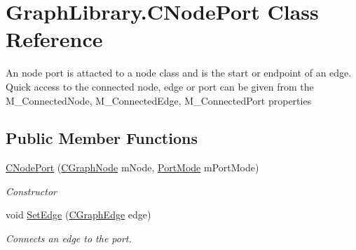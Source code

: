 \hypertarget{class_graph_library_1_1_c_node_port}{}\section{Graph\+Library.\+C\+Node\+Port Class Reference}
\label{class_graph_library_1_1_c_node_port}


An node port is attacted to a node class and is the start or endpoint of an edge. Quick access to the connected node, edge or port can be given from the M\+\_\+\+Connected\+Node, M\+\_\+\+Connected\+Edge, M\+\_\+\+Connected\+Port properties  


\subsection*{Public Member Functions}
\begin{DoxyCompactItemize}
\item 
\hyperlink{class_graph_library_1_1_c_node_port_a49f34a571bc273a2ad1360d67734e602}{C\+Node\+Port} (\hyperlink{class_graph_library_1_1_c_graph_node}{C\+Graph\+Node} m\+Node, \hyperlink{namespace_graph_library_a31c4a22c3817f16aa24bafc1c822c3a4}{Port\+Mode} m\+Port\+Mode)
\begin{DoxyCompactList}\small\item\em Constructor \end{DoxyCompactList}\item 
void \hyperlink{class_graph_library_1_1_c_node_port_ac1eff0d499611bc85bd8a063f055a9a0}{Set\+Edge} (\hyperlink{class_graph_library_1_1_c_graph_edge}{C\+Graph\+Edge} edge)
\begin{DoxyCompactList}\small\item\em Connects an edge to the port. \end{DoxyCompactList}\end{DoxyCompactItemize}
